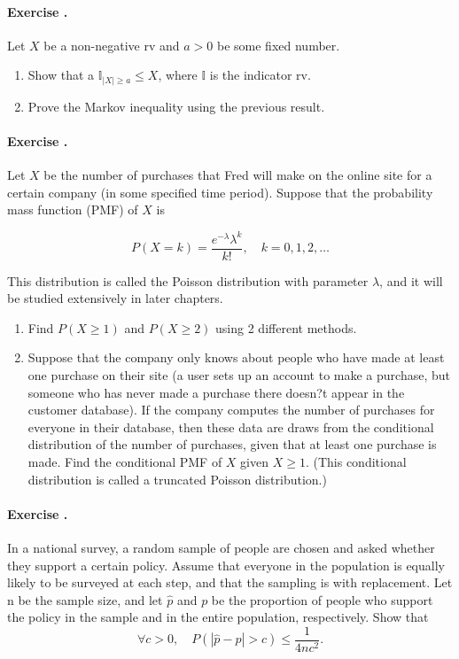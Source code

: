 \documentclass[12pt,a4paper]{article}
\newcounter{num}  %
\begin{document}
	
	\paragraph{Exercise \thenum.}
	Let $X$ be a non-negative rv and $a>0$ be some fixed number. 
	\begin{enumerate}
		\item Show that a $\mathbb I _{|X|\geq a} \leq X$, where $\mathbb I $ is the indicator rv.
		\item Prove the Markov inequality using the previous result.
	\end{enumerate}
	
	\paragraph{Exercise \thenum.}
	Let \( X \) be the number of purchases that Fred will make on the online site for a certain company (in some specified time period). Suppose that the probability mass function (PMF) of \( X \) is
	
	\[
	P(X = k) = \frac{e^{-\lambda} \lambda^k}{k!}, \quad k = 0, 1, 2, \dots
	\]
	
	This distribution is called the Poisson distribution with parameter \( \lambda \), and it will be studied extensively in later chapters.
	\begin{enumerate}
		\item Find \( P(X \geq 1) \) and \( P(X \geq 2) \) using 2 different methods.
		
		\item Suppose that the company only knows about people who have made at least one purchase on their site (a user sets up an account to make a purchase, but someone who has never made a purchase there doesn?t appear in the customer database). If the company computes the number of purchases for everyone in their database, then these data are draws from the conditional distribution of the number of purchases, given that at least one purchase is made. Find the conditional PMF of \( X \) given \( X \geq 1 \). (This conditional distribution is called a truncated Poisson distribution.)
	\end{enumerate}
	
	
	\paragraph{Exercise \thenum.}
	In a national survey, a random sample of people are chosen and asked whether they support a certain policy. 
	Assume that everyone in the population is equally likely to
	be surveyed at each step, and that the sampling is with replacement.
	Let n be the sample size, and let $\hat p$ and $p$ be the proportion of people who support the policy in the sample
	and in the entire population, respectively. 
	Show that
	\begin{equation}
		\forall c>0, \quad P(|\hat p - p|>c) \leq \frac{1}{4nc^2}.
	\end{equation}
	
\end{document}
